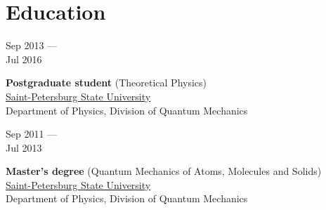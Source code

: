 \documentclass[10pt,a4paper]{article}
\newcommand{\lmpratio}{0.15}
\newcommand{\rmpratio}{0.74}
\newcommand{\horizontalSpace}{0.05\textwidth}
\newcommand{\sectionMain}[1]{\textbf{#1}}
\begin{document}
	\section*{Education}
	
	\begin{minipage}[t]{\lmpratio\textwidth}
		Sep 2013 --- \\Jul 2016
	\end{minipage}
	\hspace{\horizontalSpace}
	\begin{minipage}[t]{\rmpratio\textwidth}
		\sectionMain{Postgraduate student} (Theoretical Physics)\\[0.1cm]		
		\href{http://english.spbu.ru/}{Saint-Petersburg State University}\\ Department of Physics, Division of Quantum Mechanics
	\end{minipage}

	\vspace{1cm}
	
	\begin{minipage}[t]{\lmpratio\textwidth}
		Sep 2011 --- \\Jul 2013
	\end{minipage}
	\hspace{\horizontalSpace}
	\begin{minipage}[t]{\rmpratio\textwidth}
		\sectionMain{Master's degree} (Quantum Mechanics of Atoms, Molecules and Solids) \\[0.1cm]
		\href{http://english.spbu.ru/}{Saint-Petersburg State University}\\ Department of Physics, Division of Quantum Mechanics
	\end{minipage}

	\vspace{1cm}
	
\end{document}
